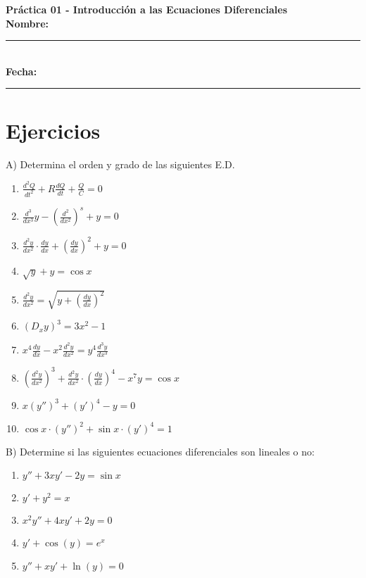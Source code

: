 \documentclass[a4paper,12pt]{article}
\begin{document}
\begin{center}
    \Huge\textbf{Práctica 01 - Introducción a las Ecuaciones Diferenciales}\\[1cm]
    \Large \textbf{Nombre:} \rule{10cm}{0.4pt} \\
    \Large \textbf{Fecha:} \rule{5cm}{0.4pt}
\end{center}

\section*{Ejercicios}
A) Determina el orden y grado de las siguientes E.D.
\large

\begin{enumerate}[label=\Large\arabic*.]
    \item $\displaystyle \frac{d^2Q}{dt^2} + R \frac{dQ}{dt} + \frac{Q}{C} = 0$
    \item $\displaystyle \frac{d^3}{dx^3} y - \left(\frac{d^2}{dx^2} \right)^s + y = 0$
    \item $\displaystyle \frac{d^2 y}{dx^2} \cdot \frac{dy}{dx} + \left(\frac{dy}{dx}\right)^2 + y = 0$
    \item $\displaystyle \sqrt{y} + y = \cos x$
    \item $\displaystyle \frac{d^2 y}{dx^2} = \sqrt{y + \left(\frac{dy}{dx}\right)^2}$
    \item $\displaystyle (D_x y)^3 = 3x^2 - 1$
    \item $\displaystyle x^4 \frac{dy}{dx} - x^2 \frac{d^2 y}{dx^2} = y^4 \frac{d^3 y}{dx^3}$
    \item $\displaystyle \left(\frac{d^2 y}{dx^2}\right)^3 + \frac{d^2 y}{dx^2} \cdot \left(\frac{dy}{dx}\right)^4 - x^7 y = \cos x$
    \item $\displaystyle x \left( y'' \right)^3 + \left( y' \right)^4 - y = 0$
    \item $\displaystyle \cos x \cdot \left( y'' \right)^2 + \sin x \cdot \left( y' \right)^4 = 1$

\end{enumerate}
B) Determine si las siguientes ecuaciones diferenciales son lineales o no:
\large
\begin{enumerate}[label=\Large\arabic*.]
    
        \item $\displaystyle y'' + 3xy' - 2y = \sin x$
        \item $\displaystyle y' + y^2 = x$
        \item $\displaystyle x^2 y'' + 4xy' + 2y = 0$
        \item $\displaystyle y' + \cos(y) = e^x$
        \item $\displaystyle y'' + x y' + \ln(y) = 0$
    
\end{enumerate}
\end{document}

